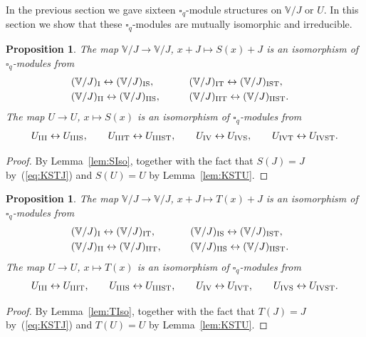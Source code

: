 \documentclass[pdftex]{sigma}
\numberwithin{equation}{section}
\newtheorem{Proposition}[Theorem]{Proposition}
 { \theoremstyle{definition}
\newtheorem{Definition}[Theorem]{Definition}
\newtheorem{Example}[Theorem]{Example}
\newtheorem{Note}[Theorem]{Note}
}
\begin{document}
In the previous section we gave sixteen $\square_q$-module structures on $\mathbb V/J$ or $U$. In this section we show that these $\square_q$-modules are mutually isomorphic and irreducible.

\begin{Proposition}\label{prop:Smix} The map $\mathbb V/J\to \mathbb V/J$, $x+J\mapsto S(x)+J$ is an isomorphism of $\square_q$-modules from
\begin{alignat*}{3}
&(\mathbb V/J)_{\rm I} \leftrightarrow (\mathbb V/J)_{\rm IS}, \qquad &&
(\mathbb V/J)_{\rm IT} \leftrightarrow (\mathbb V/J)_{\rm IST},&\\
&(\mathbb V/J)_{\rm II} \leftrightarrow (\mathbb V/J)_{\rm IIS}, \qquad &&
(\mathbb V/J)_{\rm IIT} \leftrightarrow (\mathbb V/J)_{\rm IIST}.&
\end{alignat*}
The map $U \to U$, $x \mapsto S(x)$ is an isomorphism of $\square_q$-modules from
\begin{gather*}
U_{\rm III} \leftrightarrow U_{\rm IIIS}, \qquad
U_{\rm IIIT} \leftrightarrow U_{\rm IIIST}, \qquad
U_{\rm IV} \leftrightarrow U_{\rm IVS}, \qquad
U_{\rm IVT} \leftrightarrow U_{\rm IVST}.
\end{gather*}
\end{Proposition}
\begin{proof} By Lemma~\ref{lem:SIso}, together with the fact that $S(J)=J$ by~(\ref{eq:KSTJ}) and $S(U)=U$ by Lemma~\ref{lem:KSTU}.
\end{proof}

\begin{Proposition}\label{prop:Tmix}The map $\mathbb V/J\to \mathbb V/J$, $x+J\mapsto T(x)+J$ is an isomorphism of $\square_q$-modules from
\begin{alignat*}{3}
& (\mathbb V/J)_{\rm I} \leftrightarrow (\mathbb V/J)_{\rm IT}, \qquad &&
(\mathbb V/J)_{\rm IS} \leftrightarrow (\mathbb V/J)_{\rm IST},&\\
&(\mathbb V/J)_{\rm II} \leftrightarrow (\mathbb V/J)_{\rm IIT}, \qquad &&
(\mathbb V/J)_{\rm IIS} \leftrightarrow (\mathbb V/J)_{\rm IIST}.&
\end{alignat*}
The map $U \to U$, $x \mapsto T(x)$ is an isomorphism of $\square_q$-modules from
\begin{gather*}
 U_{\rm III} \leftrightarrow U_{\rm IIIT}, \qquad
U_{\rm IIIS} \leftrightarrow U_{\rm IIIST}, \qquad
U_{\rm IV} \leftrightarrow U_{\rm IVT}, \qquad
U_{\rm IVS} \leftrightarrow U_{\rm IVST}.
\end{gather*}
\end{Proposition}
\begin{proof} By Lemma~\ref{lem:TIso}, together with the fact that $T(J)=J$ by~(\ref{eq:KSTJ}) and $T(U)=U$ by Lemma~\ref{lem:KSTU}.
\end{proof}
\end{document}
